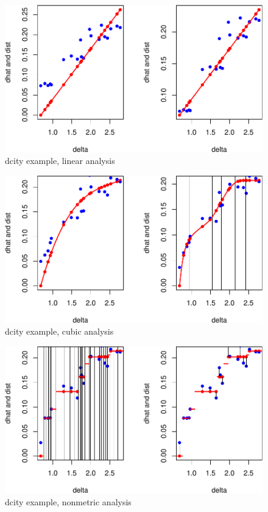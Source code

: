 \documentclass[
  12pt,
]{article}
\begin{document}
\begin{figure}

{\centering \includegraphics{smacofManual_files/figure-latex/hdcitylinear-1} 

}

\caption{dcity example, linear analysis}\label{fig:hdcitylinear}
\end{figure}
\begin{figure}

{\centering \includegraphics{smacofManual_files/figure-latex/hdcitycubic-1} 

}

\caption{dcity example, cubic analysis}\label{fig:hdcitycubic}
\end{figure}
\begin{figure}

{\centering \includegraphics{smacofManual_files/figure-latex/hdcityordinal-1} 

}

\caption{dcity example, nonmetric analysis}\label{fig:hdcityordinal}
\end{figure}
\end{document}
